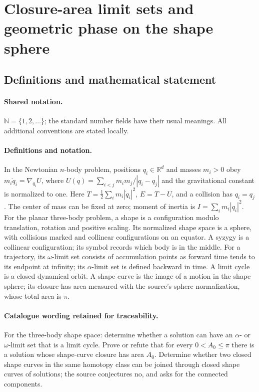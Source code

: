 \documentclass[11pt]{article}
\begin{document}
\section{Closure-area limit sets and geometric phase on the shape sphere}\label{statement}

\subsection{Definitions and mathematical statement}

\paragraph{Shared notation.}$\mathbb N=\{1,2,\ldots\}$; the standard number fields have their usual meanings. All additional conventions are stated locally.


\paragraph{Definitions and notation.}In the Newtonian $n$-body problem, positions $q_i\in\mathbb R^d$ and masses $m_i>0$ obey $m_i\ddot q_i=\nabla_{q_i}U$, where $U(q)=\sum_{i<j}m_im_j/|q_i-q_j|$ and the gravitational constant is normalized to one. Here $T=\tfrac12\sum_i m_i|\dot q_i|^2$, $E=T-U$, and a collision has $q_i=q_j$. The center of mass can be fixed at zero; moment of inertia is $I=\sum_i m_i|q_i|^2$. For the planar three-body problem, a shape is a configuration modulo translation, rotation and positive scaling. Its normalized shape space is a sphere, with collisions marked and collinear configurations on an equator. A syzygy is a collinear configuration; its symbol records which body is in the middle. For a trajectory, its $\omega$-limit set consists of accumulation points as forward time tends to its endpoint at infinity; its $\alpha$-limit set is defined backward in time. A limit cycle is a closed dynamical orbit. A shape curve is the image of a motion in the shape sphere; its closure has area measured with the source’s sphere normalization, whose total area is $\pi$.

\paragraph{Catalogue wording retained for traceability.}
For the three-body shape space: determine whether a solution can have an $\alpha$- or $\omega$-limit set that is a limit cycle. Prove or refute that for every $0<A_0\le\pi$ there is a solution whose shape-curve closure has area $A_0$. Determine whether two closed shape curves in the same homotopy class can be joined through closed shape curves of solutions; the source conjectures no, and asks for the connected components.
\end{document}
